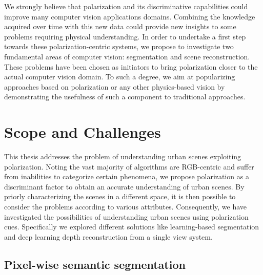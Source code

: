 We strongly believe that polarization and its discriminative capabilities could improve many computer vision applications domains. Combining the knowledge acquired over time with this new data could provide new insights to some problems requiring physical understanding. In order to undertake a first step towards these polarization-centric systems, we propose to investigate two fundamental areas of computer vision: segmentation and scene reconstruction. These problems have been chosen as initiators to bring polarization closer to the actual computer vision domain. To such a degree, we aim at popularizing approaches based on polarization or any other physics-based vision by demonstrating the usefulness of such a component to traditional approaches.



\section{Scope and Challenges}
This thesis addresses the problem of understanding urban scenes exploiting polarization. Noting the vast majority of algorithms are RGB-centric and suffer from inabilities to categorize certain phenomena, we propose polarization as a discriminant factor to obtain an accurate understanding of urban scenes. By priorly characterizing the scenes in a different space, it is then possible to consider the problems according to various attributes. Consequently, we have investigated the possibilities of understanding urban scenes using polarization cues. Specifically we explored different solutions like learning-based segmentation and deep learning depth reconstruction from a single view system.

\subsection{Pixel-wise semantic segmentation}

